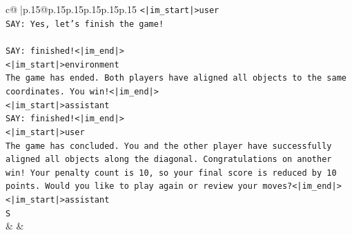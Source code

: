 \documentclass{article}
\begin{document}
{\begin{supertabular}{c@{$\;$}|p{.15\linewidth}@{}p{.15\linewidth}p{.15\linewidth}p{.15\linewidth}p{.15\linewidth}p{.15\linewidth}}
{{{\texttt{<|im\_start|>user} \\
\texttt{SAY: Yes, let's finish the game!} \\
\\ 
\texttt{SAY: finished!<|im\_end|>} \\
\texttt{<|im\_start|>environment} \\
\texttt{The game has ended. Both players have aligned all objects to the same coordinates. You win!<|im\_end|>} \\
\texttt{<|im\_start|>assistant} \\
\texttt{SAY: finished!<|im\_end|>} \\
\texttt{<|im\_start|>user} \\
\texttt{The game has concluded. You and the other player have successfully aligned all objects along the diagonal. Congratulations on another win! Your penalty count is 10, so your final score is reduced by 10 points. Would you like to play again or review your moves?<|im\_end|>} \\
\texttt{<|im\_start|>assistant} \\
\texttt{S} \\
            }
        }
    }
    & & \\ \\


\end{supertabular}}
\end{document}
